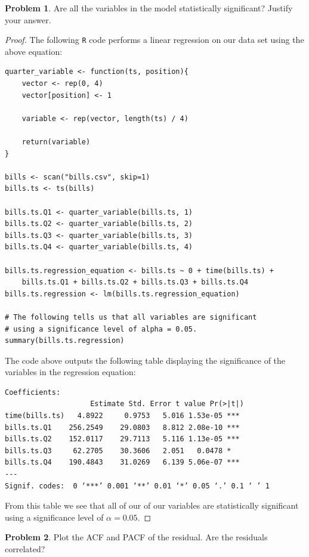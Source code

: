 \documentclass[12pt]{article}
\theoremstyle{definition}
\newtheorem{problem}{Problem}
\begin{document}
\begin{problem}
  Are all the variables in the model statistically significant? Justify your answer.
\end{problem}

\begin{proof}
  The following \texttt{R} code performs a linear regression on our data set using the
  above equation:
  \begin{verbatim}
quarter_variable <- function(ts, position){
    vector <- rep(0, 4)
    vector[position] <- 1

    variable <- rep(vector, length(ts) / 4)

    return(variable)
}

bills <- scan("bills.csv", skip=1)
bills.ts <- ts(bills)

bills.ts.Q1 <- quarter_variable(bills.ts, 1)
bills.ts.Q2 <- quarter_variable(bills.ts, 2)
bills.ts.Q3 <- quarter_variable(bills.ts, 3)
bills.ts.Q4 <- quarter_variable(bills.ts, 4)

bills.ts.regression_equation <- bills.ts ~ 0 + time(bills.ts) +
    bills.ts.Q1 + bills.ts.Q2 + bills.ts.Q3 + bills.ts.Q4
bills.ts.regression <- lm(bills.ts.regression_equation)

# The following tells us that all variables are significant
# using a significance level of alpha = 0.05.
summary(bills.ts.regression)

  \end{verbatim}

  The code above outputs the following table displaying the significance of the
  variables in the regression equation:
  \begin{verbatim}
Coefficients:
                    Estimate Std. Error t value Pr(>|t|)
time(bills.ts)   4.8922     0.9753   5.016 1.53e-05 ***
bills.ts.Q1    256.2549    29.0803   8.812 2.08e-10 ***
bills.ts.Q2    152.0117    29.7113   5.116 1.13e-05 ***
bills.ts.Q3     62.2705    30.3606   2.051   0.0478 *
bills.ts.Q4    190.4843    31.0269   6.139 5.06e-07 ***
---
Signif. codes:  0 ‘***’ 0.001 ‘**’ 0.01 ‘*’ 0.05 ‘.’ 0.1 ‘ ’ 1
  \end{verbatim}

From this table we see that all of our of our variables are statistically significant
using a significance level of $\alpha=0.05$.
\end{proof}

\begin{problem}
  Plot the ACF and PACF of the residual. Are the residuals correlated?
\end{problem}
\end{document}
